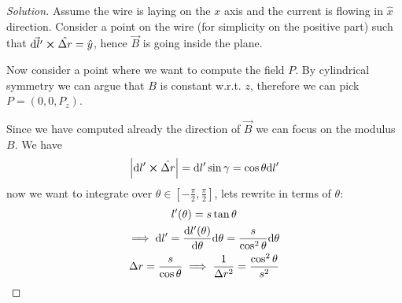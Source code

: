 \documentclass[12pt]{extarticle}
\begin{document}
\begin{proof}[Solution]
	Assume the wire is laying on the $x$ axis and the current is flowing in $\hat x$ direction.
	Consider a point on the wire (for simplicity on the positive part)
	such that $\vec{\dd l '} \cross \hat{\Delta r} = \hat y$,
	hence $\vec B$ is going inside the plane.

	Now consider a point where we want to compute the field $P$.
	By cylindrical symmetry we can argue that $B$ is constant w.r.t. $z$,
	therefore we can pick $P = (0, 0, P_z)$.

	\begin{figure}[H]
		\centering
	\end{figure}

	Since we have computed already the direction of $\vec B$ we can focus on the modulus $B$.
	We have
	\begin{equation}
		\abs{\dd l' \cross \hat{\Delta r}} = \dd l' \sin \gamma = \cos \theta \dd l'
	\end{equation}
	now we want to integrate over $\theta \in [-\frac{\pi}{2}, \frac{\pi}{2}]$,
	lets rewrite in terms of $\theta$:
	\begin{gather}
		l'(\theta) = s \tan \theta \\
		\implies \dd l' = \dv{l'(\theta)}{\theta} \dd \theta = \frac{s}{\cos ^2 \theta} \dd \theta \\
		\Delta r = \frac{s}{\cos \theta} \implies \frac{1}{\Delta r^2} = \frac{\cos ^2 \theta}{s^2}
	\end{gather}


\end{proof}
\end{document}
